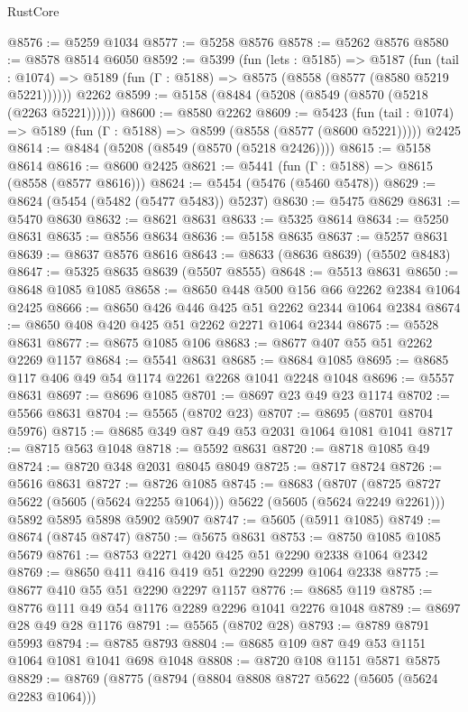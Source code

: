 \begin{lexlean}{RustCore}
\begin{coremodule}
@8576 := @5259 @1034
@8577 := @5258 @8576
@8578 := @5262 @8576
@8580 := @8578 @8514 @6050
@8592 := @5399
    (fun (lets : @5185) =>
    @5187
      (fun (tail : @1074) => @5189 (fun (Γ : @5188) => @8575 (@8558 (@8577 (@8580 @5219 @5221))))))
    @2262
@8599 := @5158 (@8484 (@5208 (@8549 (@8570 (@5218 (@2263 @5221))))))
@8600 := @8580 @2262
@8609 := @5423
    (fun (tail : @1074) => @5189 (fun (Γ : @5188) => @8599 (@8558 (@8577 (@8600 @5221)))))
    @2425
@8614 := @8484 (@5208 (@8549 (@8570 (@5218 @2426))))
@8615 := @5158 @8614
@8616 := @8600 @2425
@8621 := @5441 (fun (Γ : @5188) => @8615 (@8558 (@8577 @8616)))
@8624 := @5454 (@5476 (@5460 @5478))
@8629 := @8624 (@5454 (@5482 (@5477 @5483)) @5237)
@8630 := @5475 @8629
@8631 := @5470 @8630
@8632 := @8621 @8631
@8633 := @5325 @8614
@8634 := @5250 @8631
@8635 := @8556 @8634
@8636 := @5158 @8635
@8637 := @5257 @8631
@8639 := @8637 @8576 @8616
@8643 := @8633 (@8636 @8639) (@5502 @8483)
@8647 := @5325 @8635 @8639 (@5507 @8555)
@8648 := @5513 @8631
@8650 := @8648 @1085 @1085
@8658 := @8650 @448 @500 @156 @66 @2262 @2384 @1064 @2425
@8666 := @8650 @426 @446 @425 @51 @2262 @2344 @1064 @2384
@8674 := @8650 @408 @420 @425 @51 @2262 @2271 @1064 @2344
@8675 := @5528 @8631
@8677 := @8675 @1085 @106
@8683 := @8677 @407 @55 @51 @2262 @2269 @1157
@8684 := @5541 @8631
@8685 := @8684 @1085
@8695 := @8685 @117 @406 @49 @54 @1174 @2261 @2268 @1041 @2248 @1048
@8696 := @5557 @8631
@8697 := @8696 @1085
@8701 := @8697 @23 @49 @23 @1174
@8702 := @5566 @8631
@8704 := @5565 (@8702 @23)
@8707 := @8695 (@8701 @8704 @5976)
@8715 := @8685 @349 @87 @49 @53 @2031 @1064 @1081 @1041
@8717 := @8715 @563 @1048
@8718 := @5592 @8631
@8720 := @8718 @1085 @49
@8724 := @8720 @348 @2031 @8045 @8049
@8725 := @8717 @8724
@8726 := @5616 @8631
@8727 := @8726 @1085
@8745 := @8683
    (@8707 (@8725 @8727 @5622 (@5605 (@5624 @2255 @1064))) @5622 (@5605 (@5624 @2249 @2261)))
    @5892
    @5895
    @5898
    @5902
    @5907
@8747 := @5605 (@5911 @1085)
@8749 := @8674 (@8745 @8747)
@8750 := @5675 @8631
@8753 := @8750 @1085 @1085 @5679
@8761 := @8753 @2271 @420 @425 @51 @2290 @2338 @1064 @2342
@8769 := @8650 @411 @416 @419 @51 @2290 @2299 @1064 @2338
@8775 := @8677 @410 @55 @51 @2290 @2297 @1157
@8776 := @8685 @119
@8785 := @8776 @111 @49 @54 @1176 @2289 @2296 @1041 @2276 @1048
@8789 := @8697 @28 @49 @28 @1176
@8791 := @5565 (@8702 @28)
@8793 := @8789 @8791 @5993
@8794 := @8785 @8793
@8804 := @8685 @109 @87 @49 @53 @1151 @1064 @1081 @1041 @698 @1048
@8808 := @8720 @108 @1151 @5871 @5875
@8829 := @8769
    (@8775
      (@8794
        (@8804 @8808 @8727 @5622 (@5605 (@5624 @2283 @1064)))

\end{coremodule}
\end{lexlean}
